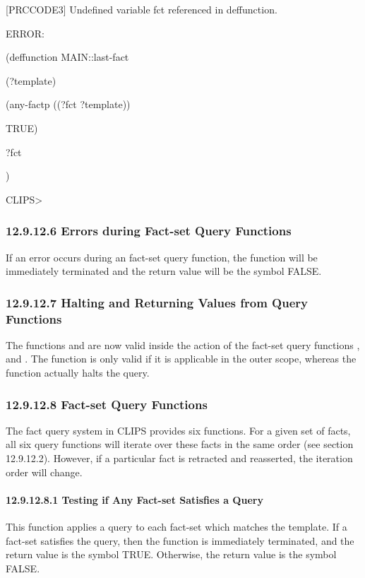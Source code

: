 \documentclass[letterpaper,10pt,english]{sphinxmanual}
\begin{document}
{[}PRCCODE3{]} Undefined variable fct referenced in deffunction.

ERROR:

(deffunction MAIN::last-fact

(?template)

(any-factp ((?fct ?template))

TRUE)

?fct

)

CLIPS\textgreater{}


\subsubsection{12.9.12.6 Errors during Fact-set Query Functions}
\label{\detokenize{actions:errors-during-fact-set-query-functions}}
If an error occurs during an fact-set query function, the function will
be immediately terminated and the return value will be the symbol FALSE.


\subsubsection{12.9.12.7 Halting and Returning Values from Query Functions}
\label{\detokenize{actions:halting-and-returning-values-from-query-functions}}\label{\detokenize{actions:halting-and-returning-values-from-query-functions-1}}
The functions  and  are now valid inside the action
of the fact-set query functions , 
and . The  function is only valid
if it is applicable in the outer scope, whereas the  function
actually halts the query.


\subsubsection{12.9.12.8 Fact-set Query Functions}
\label{\detokenize{actions:fact-set-query-functions}}
The fact query system in CLIPS provides six functions. For a given set
of facts, all six query functions will iterate over these facts in the
same order (see section 12.9.12.2). However, if a particular fact is
retracted and reasserted, the iteration order will change.


\paragraph{12.9.12.8.1 Testing if Any Fact-set Satisfies a Query}
\label{\detokenize{actions:testing-if-any-fact-set-satisfies-a-query}}
This function applies a query to each fact-set which matches the
template. If a fact-set satisfies the query, then the function is
immediately terminated, and the return value is the symbol TRUE.
Otherwise, the return value is the symbol FALSE.
\end{document}
